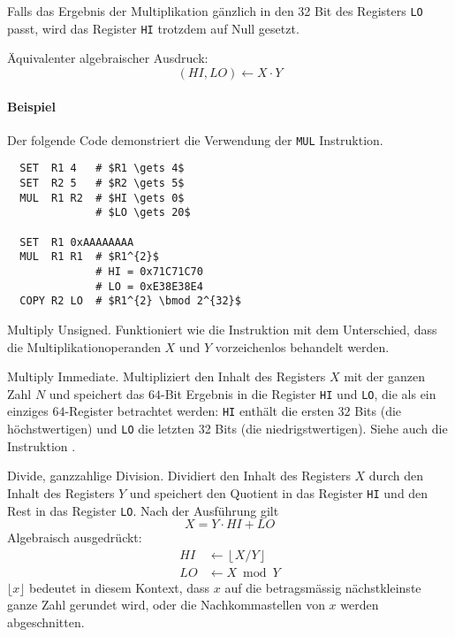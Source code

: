 Falls das Ergebnis der Multiplikation gänzlich in den 32 Bit des Registers
\texttt{LO} passt, wird das Register \texttt{HI} trotzdem auf Null gesetzt.

Äquivalenter algebraischer Ausdruck:
\[
    (HI, LO) \gets X \cdot Y
\]

\paragraph{Beispiel} Der folgende Code demonstriert die Verwendung der
\texttt{MUL} Instruktion.
\begin{lstlisting}
  SET  R1 4   # $R1 \gets 4$
  SET  R2 5   # $R2 \gets 5$
  MUL  R1 R2  # $HI \gets 0$
              # $LO \gets 20$

  SET  R1 0xAAAAAAAA
  MUL  R1 R1  # $R1^{2}$
              # HI = 0x71C71C70
              # LO = 0xE38E38E4 
  COPY R2 LO  # $R1^{2} \bmod 2^{32}$ 
\end{lstlisting}



\glqq Multiply Unsigned\grqq.
Funktioniert wie die Instruktion  mit dem Unterschied, dass die
Multiplikationoperanden $X$ und $Y$ vorzeichenlos behandelt werden. 



\glqq Multiply Immediate\grqq.
Multipliziert den Inhalt des Registers $X$ mit der ganzen Zahl $N$ und speichert
das $64$-Bit Ergebnis in die Register \texttt{HI} und \texttt{LO}, die als ein
einziges $64$-Register betrachtet werden: \texttt{HI} enthält die ersten $32$
Bits (die höchstwertigen) und \texttt{LO} die letzten 32 Bits (die
niedrigstwertigen).
Siehe auch die Instruktion .



\glqq Divide\grqq, ganzzahlige Division.
Dividiert den Inhalt des Registers $X$ durch den Inhalt des Registers $Y$ und
speichert den Quotient in das Register \texttt{HI} und den Rest in das Register
\texttt{LO}.
Nach der Ausführung gilt
\[
    X = Y \cdot HI + LO
\]
Algebraisch ausgedrückt:
\begin{align*}
  HI & \gets \left\lfloor X/Y \right\rfloor \\
  LO & \gets X \bmod Y
\end{align*}
$\lfloor x \rfloor$ bedeutet in diesem Kontext, dass $x$ auf die betragsmässig
nächstkleinste ganze Zahl gerundet wird, oder die Nachkommastellen von $x$
werden abgeschnitten.

